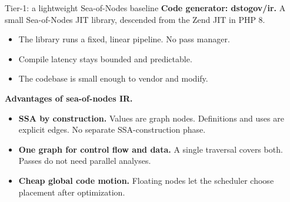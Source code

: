 \documentclass[aspectratio=169,11pt]{beamer}
\begin{document}
\begin{frame}{Tier-1: a lightweight Sea-of-Nodes baseline}
  \textbf{Code generator: dstogov/ir.}
  A small Sea-of-Nodes JIT library, descended from the Zend JIT in PHP 8.
  \begin{itemize}\setlength{\itemsep}{1pt}
    \item The library runs a fixed, linear pipeline. No pass manager.
    \item Compile latency stays bounded and predictable.
    \item The codebase is small enough to vendor and modify.
  \end{itemize}
  \vspace{0.5em}
  \textbf{Advantages of sea-of-nodes IR.}
  \begin{itemize}\setlength{\itemsep}{1pt}
    \item \textbf{SSA by construction.} Values are graph nodes. Definitions and uses are explicit edges. No separate SSA-construction phase.
    \item \textbf{One graph for control flow and data.} A single traversal covers both. Passes do not need parallel analyses.
    \item \textbf{Cheap global code motion.} Floating nodes let the scheduler choose placement after optimization.
  \end{itemize}
\end{frame}
\end{document}
